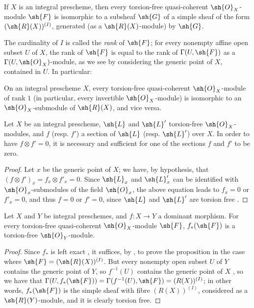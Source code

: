 \begin{proposition}[7.4.2]
\label{I.7.4.2}
If $X$ is an integral prescheme, then every torsion-free quasi-coherent $\sh{O}_X$-module $\sh{F}$ is isomorphic to a subsheaf $\sh{G}$ of a simple sheaf of the form $(\sh{R}(X))^{(I)}$, generated (as a $\sh{R}(X)$-module) by $\sh{G}$.
\end{proposition}

The cardinality of $I$ is called the \emph{rank} of $\sh{F}$; for every nonempty affine open subset $U$ of $X$, the rank of $\sh{F}$ is equal to the rank of $\Gamma(U,\sh{F})$ as a $\Gamma(U,\sh{O}_X)$-module, as we see by considering the generic point of $X$, contained in $U$.
In particular:
\begin{corollary}[7.4.3]
\label{I.7.4.3}
On an integral prescheme $X$, every torsion-free quasi-coherent $\sh{O}_X$-module of rank $1$ (in particular, every invertible $\sh{O}_X$-module) is isomorphic to an $\sh{O}_X$-submodule of $\sh{R}(X)$, and vice versa.
\end{corollary}

\begin{corollary}[7.4.4]
\label{I.7.4.4}
Let $X$ be an integral prescheme, $\sh{L}$ and $\sh{L}'$ torsion-free $\sh{O}_X$-modules, and $f$ (resp. $f'$) a section of $\sh{L}$ (resp. $\sh{L}'$) over $X$.
In order to have $f\otimes f'=0$, it is necessary and sufficient for one of the sections $f$ and $f'$ to be zero.
\end{corollary}

\begin{proof}
Let $x$ be the generic point of $X$; we have, by hypothesis, that $(f\otimes f')_x=f_x\otimes f'_x=0$.
Since $\sh{L}_x$ and $\sh{L}'_x$ can be identified with $\sh{O}_x$-submodules of the field $\sh{O}_x$, the above equation leads to $f_x=0$ or $f'_x=0$, and thus $f=0$ or $f'=0$, since $\sh{L}$ and $\sh{L}'$ are torsion free .
\end{proof}

\begin{proposition}[7.4.5]
\label{I.7.4.5}
Let $X$ and $Y$ be integral preschemes, and $f:X\to Y$ a dominant morphism.
For every torsion-free quasi-coherent $\sh{O}_X$-module $\sh{F}$, $f_*(\sh{F})$ is a torsion-free $\sh{O}_Y$-module.
\end{proposition}

\begin{proof}
Since
$f_*$ is left exact , it suffices, by , to prove the proposition in the case where $\sh{F}=(\sh{R}(X))^{(I)}$.
But every nonempty open subset $U$ of $Y$ contains the generic point of $Y$, so $f^{-1}(U)$ contains the generic point of $X$ , so we have that $\Gamma(U,f_*(\sh{F}))=\Gamma(f^{-1}(U),\sh{F})=(R(X))^{(I)}$; in other words, $f_*(\sh{F})$ is the simple sheaf with fibre $(R(X))^{(I)}$, considered as a $\sh{R}(Y)$-module, and it is clearly torsion free.
\end{proof}

